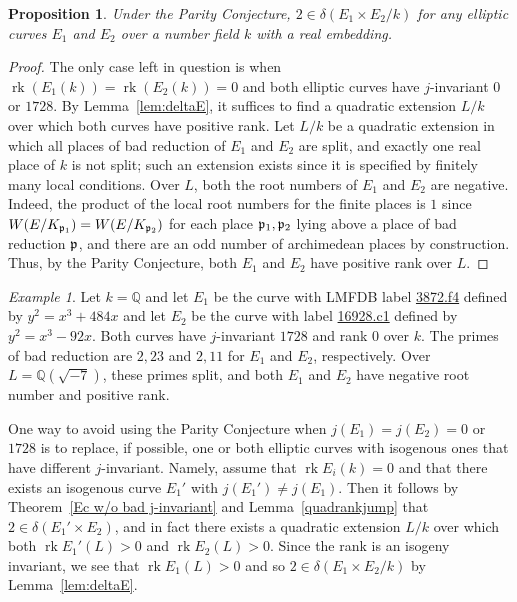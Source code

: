 \documentclass[a4paper,11pt]{amsart}
\theoremstyle{plain}
\newtheorem{prop}[thm]{Proposition}
\theoremstyle{remark}
\newtheorem{example}[thm]{Example}
\newcommand{\rk}{\operatorname{rk}}
\newcommand{\dendegs}{\delta}
\begin{document}
\begin{prop}\label{prop:parity}  Under the Parity Conjecture, $2 \in \dendegs(E_1 \times E_2 / k)$ for any elliptic curves $E_1$ and $E_2$ over a number field $k$ with a real embedding.
\end{prop}

\begin{proof} The only case left in question is when $\rk(E_1(k))=\rk(E_2(k))=0$ and both elliptic curves have $j$-invariant $0$ or $1728$. By Lemma~\ref{lem:deltaE}, it suffices to find a quadratic extension $L/k$ over which both curves have positive rank. Let $L/k$ be a quadratic extension in which all places of bad reduction of $E_1$ and $E_2$ are split, and exactly one real place of $k$ is not split; such an extension exists since it is specified by finitely many local conditions. Over $L$, both the root numbers of $E_1$ and $E_2$ are negative. Indeed, the product of the local root numbers for the finite places is $1$ since $W(E/K_{\frak{p}_1}) = W(E/K_{\frak{p}_2})$ for each place $\frak{p}_1, \frak{p}_2$ lying above a place of bad reduction $\frak{p}$, and there are an odd number of archimedean places by construction. Thus, by the Parity Conjecture, both $E_1$ and $E_2$ have positive rank over $L$.
\end{proof}

\begin{example} Let $k =\mathbb{Q}$ and let $E_1$ be the curve with LMFDB label \href{https://www.lmfdb.org/EllipticCurve/Q/3872/f/4}{3872.f4} defined by $y^2=x^3 + 484x$ and let $E_2$ be the curve with label \href{https://www.lmfdb.org/EllipticCurve/Q/16928/c/1}{16928.c1} defined by $y^2=x^3-92x$. Both curves have $j$-invariant $1728$ and rank $0$ over $k$. The primes of bad reduction are $2,23$ and $2,11$ for $E_1$ and $E_2$, respectively. Over $L = \mathbb{Q}(\sqrt{-7})$, these primes split, and both $E_1$ and $E_2$ have negative root number and positive rank.
\end{example}

One way to avoid using the Parity Conjecture when $j(E_1)=j(E_2)=0$ or $1728$ is to replace, if possible, one or both elliptic curves with isogenous ones that have different $j$-invariant. Namely,
assume that \(\rk E_i(k) = 0\) and that  there exists an isogenous curve \(E_1'\) with \(j(E_1')\neq j(E_1)\).  Then it follows by Theorem~\ref{Ec w/o bad j-invariant} and  Lemma~\ref{quadrankjump}  that $2\in\delta(E_1'\times E_2)$, and in fact there exists a quadratic extension \(L/k\) over which both \(\rk E_1'(L) >0\) and \(\rk E_2(L) >0\).  Since the rank is an isogeny invariant, we see that \(\rk E_1(L) >0\) and so \(2 \in \dendegs(E_1 \times E_2/k)\) by Lemma~\ref{lem:deltaE}.
\end{document}
